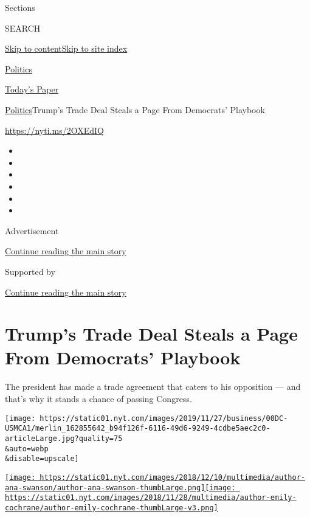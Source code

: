Sections

SEARCH

\protect\hyperlink{site-content}{Skip to
content}\protect\hyperlink{site-index}{Skip to site index}

\href{https://www.nytimes.com/section/politics}{Politics}

\href{https://myaccount.nytimes.com/auth/login?response_type=cookie\&client_id=vi}{}

\href{https://www.nytimes.com/section/todayspaper}{Today's Paper}

\href{/section/politics}{Politics}\textbar{}Trump's Trade Deal Steals a
Page From Democrats' Playbook

\url{https://nyti.ms/2OXEdIQ}

\begin{itemize}
\item
\item
\item
\item
\item
\item
\end{itemize}

Advertisement

\protect\hyperlink{after-top}{Continue reading the main story}

Supported by

\protect\hyperlink{after-sponsor}{Continue reading the main story}

\hypertarget{trumps-trade-deal-steals-a-page-from-democrats-playbook}{%
\section{Trump's Trade Deal Steals a Page From Democrats'
Playbook}\label{trumps-trade-deal-steals-a-page-from-democrats-playbook}}

The president has made a trade agreement that caters to his opposition
--- and that's why it stands a chance of passing Congress.

\texttt{[image: https://static01.nyt.com/images/2019/11/27/business/00DC-USMCA1/merlin\_162855642\_b94f126f-6116-49d6-9249-4cdbe5aec2c0-articleLarge.jpg?quality=75\\\&auto=webp\\\&disable=upscale]}

\href{https://www.nytimes.com/by/ana-swanson}{\texttt{[image: https://static01.nyt.com/images/2018/12/10/multimedia/author-ana-swanson/author-ana-swanson-thumbLarge.png]}}\href{https://www.nytimes.com/by/emily-cochrane}{\texttt{[image: https://static01.nyt.com/images/2018/11/28/multimedia/author-emily-cochrane/author-emily-cochrane-thumbLarge-v3.png]}}

